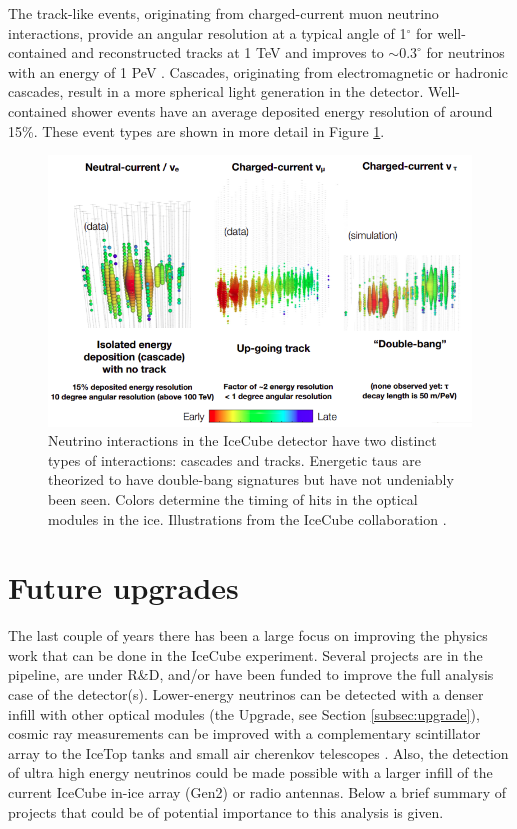 The track-like events, originating from charged-current muon neutrino interactions, provide an angular resolution at a typical angle of 1$^\circ$ for well-contained and reconstructed tracks at 1 TeV and improves to $\sim 0.3^\circ$ for neutrinos with an energy of 1 PeV \cite{Aartsen:2018ywr}. Cascades, originating from electromagnetic or hadronic cascades, result in a more spherical light generation in the detector. Well-contained shower events have an average deposited energy resolution of around 15\%. These event types are shown in more detail in Figure \ref{fig:ICinteractions2}.
 

\begin{figure}
\centering
\includegraphics[width=\textwidth]{chapter4/img/ICinteractions2.png}
\caption{Neutrino interactions in the IceCube detector have two distinct types of interactions: cascades and tracks. Energetic taus are theorized to have double-bang signatures but have not undeniably been seen. Colors determine the timing of hits in the optical modules in the ice. Illustrations from the IceCube collaboration \cite{kjeroSignatures}.}
\label{fig:ICinteractions2}
\end{figure}


\section{Future upgrades}
The last couple of years there has been a large focus on improving the physics work that can be done in the IceCube experiment. Several projects are in the pipeline, are under R\&D, and/or have been funded to improve the full analysis case of the detector(s). Lower-energy neutrinos can be detected with a denser infill with other optical modules (the Upgrade, see Section \ref{subsec:upgrade}), cosmic ray measurements can be improved with a complementary scintillator array to the IceTop tanks \cite{Collaboration:2017tdy} and small air cherenkov telescopes \cite{Auffenberg:2017vwc}. Also, the detection of ultra high energy neutrinos could be made possible with a larger infill of the current IceCube in-ice array (Gen2) or radio antennas. Below a brief summary of projects that could be of potential importance to this analysis is given.

